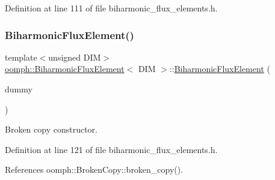 Definition at line 111 of file biharmonic\+\_\+flux\+\_\+elements.\+h.

\mbox{\label{classoomph_1_1BiharmonicFluxElement_a471a32aff811268bb75a138f7d8f4204}} 
\subsubsection{\texorpdfstring{Biharmonic\+Flux\+Element()}{BiharmonicFluxElement()}\hspace{0.1cm}{\footnotesize\ttfamily [3/4]}}
{\footnotesize\ttfamily template$<$unsigned D\+IM$>$ \\
\hyperlink{classoomph_1_1BiharmonicFluxElement}{oomph\+::\+Biharmonic\+Flux\+Element}$<$ D\+IM $>$\+::\hyperlink{classoomph_1_1BiharmonicFluxElement}{Biharmonic\+Flux\+Element} (\begin{DoxyParamCaption}\item[{const \hyperlink{classoomph_1_1BiharmonicFluxElement}{Biharmonic\+Flux\+Element}$<$ D\+IM $>$ \&}]{dummy }\end{DoxyParamCaption})\hspace{0.3cm}{\ttfamily [inline]}}



Broken copy constructor. 



Definition at line 121 of file biharmonic\+\_\+flux\+\_\+elements.\+h.



References oomph\+::\+Broken\+Copy\+::broken\+\_\+copy().

\mbox{\label{classoomph_1_1BiharmonicFluxElement_a5f8fc9a2737aff79dca7309f8fd2eb71}} 
